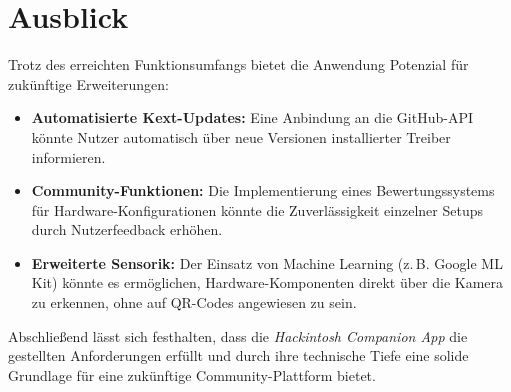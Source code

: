 \section{Ausblick}
Trotz des erreichten Funktionsumfangs bietet die Anwendung Potenzial für zukünftige Erweiterungen:
\begin{itemize}
    \item \textbf{Automatisierte Kext-Updates:} Eine Anbindung an die GitHub-API könnte Nutzer automatisch über neue Versionen installierter Treiber informieren.
    
    \item \textbf{Community-Funktionen:} Die Implementierung eines Bewertungssystems für Hardware-Konfigurationen könnte die Zuverlässigkeit einzelner Setups durch Nutzerfeedback erhöhen.
    
    \item \textbf{Erweiterte Sensorik:} Der Einsatz von Machine Learning (z.\,B. Google ML Kit) könnte es ermöglichen, Hardware-Komponenten direkt über die Kamera zu erkennen, ohne auf QR-Codes angewiesen zu sein.
\end{itemize}

Abschließend lässt sich festhalten, dass die \textit{Hackintosh Companion App} die gestellten Anforderungen erfüllt und durch ihre technische Tiefe eine solide Grundlage für eine zukünftige Community-Plattform bietet.